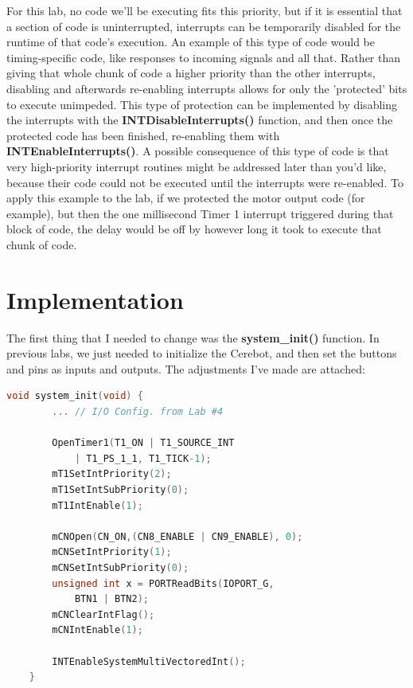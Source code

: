 \documentclass[a4paper, 12pt]{article}
\begin{document}
For this lab, no code we'll be executing fits this priority, but if it is essential that a section of code is uninterrupted, interrupts can be temporarily disabled for the runtime of that code's execution. An example of this type of code would be timing-specific code, like responses to incoming signals and all that. Rather than giving that whole chunk of code a higher priority than the other interrupts, disabling and afterwards re-enabling interrupts allows for only the 'protected' bits to execute unimpeded. This type of protection can be implemented by disabling the interrupts with the \textbf{ INTDisableInterrupts()} function, and then once the protected code has been finished, re-enabling them with \textbf{INTEnableInterrupts()}. A possible consequence of this type of code is that very high-priority interrupt routines might be addressed later than you'd like, because their code could not be executed until the interrupts were re-enabled. To apply this example to the lab, if we protected the motor output code (for example), but then the one millisecond Timer 1 interrupt triggered during that block of code, the delay would be off by however long it took to execute that chunk of code.

\section{Implementation}
The first thing that I needed to change was the \textbf{system\_init()} function. In previous labs, we just needed to initialize the Cerebot, and then set the buttons and pins as inputs and outputs. The adjustments I've made are attached:

	\begin{mdframed}[backgroundcolor=code-gray, roundcorner=10pt,
								innerleftmargin=5, innertopmargin=5, innerbottommargin=5]	
	\begin{lstlisting}[language=C, caption=System Initialization, tabsize=2]
	void system_init(void) {
		... // I/O Config. from Lab #4

		OpenTimer1(T1_ON | T1_SOURCE_INT
			| T1_PS_1_1, T1_TICK-1);
		mT1SetIntPriority(2);
		mT1SetIntSubPriority(0);
		mT1IntEnable(1);

		mCNOpen(CN_ON,(CN8_ENABLE | CN9_ENABLE), 0);
		mCNSetIntPriority(1);
		mCNSetIntSubPriority(0);
		unsigned int x = PORTReadBits(IOPORT_G,
			BTN1 | BTN2);
		mCNClearIntFlag();
		mCNIntEnable(1);

		INTEnableSystemMultiVectoredInt();
	}
	\end{lstlisting}
	\end{mdframed}
	
\end{document}
